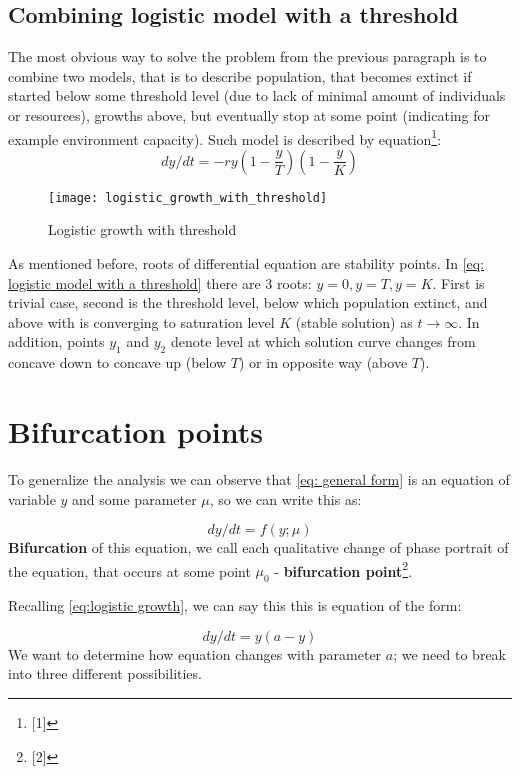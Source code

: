 \subsection{Combining logistic model with a threshold}
The most obvious way to solve the problem from the previous paragraph is to combine two models, that is to describe population, that becomes extinct if started below some threshold level (due to lack of minimal amount of individuals or resources), growths above, but eventually stop at some point (indicating for example environment capacity). Such model is described by equation\footnote{[1]}:
\begin{equation} \label{eq: logistic model with a threshold}
dy/dt = -ry(1 - \frac{y}{T})(1 - \frac{y}{K})
\end{equation}

\begin{figure}[h]
\centering
\texttt{[image: logistic\_growth\_with\_threshold]}
\caption{Logistic growth with threshold}
\label{fig:logistic growth}
\end{figure}
As mentioned before, roots of differential equation are stability points. In \ref{eq: logistic model with a threshold} there are 3 roots: $y = 0, y = T, y = K$. First is trivial case, second is the threshold level, below which population extinct, and above with is converging to saturation level $K$ (stable solution) as $t \rightarrow \infty$. In addition, points $y_1$ and $y_2$ denote level at which solution curve changes from concave down to concave up (below $T$) or in opposite way (above $T$).

\section{Bifurcation points}
To generalize the analysis we can observe that \ref{eq: general form} is an equation of variable $y$ and some parameter $\mu$, so we can write this as:

\begin{equation} \label{eq: bifrucation eq}
dy/dt = f(y; \mu)
\end{equation}
\textbf{Bifurcation} of this equation, we call each qualitative change of phase portrait of the equation, that occurs at some point $\mu_0$ - \textbf{bifurcation point}\footnote{[2]}.

Recalling \ref{eq:logistic growth}, we can say this this is equation of the form:

\begin{equation} \label{eq: square bifrucation}
dy/dt = y(a - y)
\end{equation}
We want to determine how equation changes with parameter $a$; we need to break into three different possibilities.

